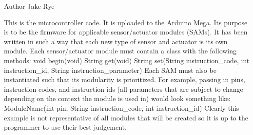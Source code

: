 \begin{DoxyAuthor}{Author}
Jake Rye
\end{DoxyAuthor}
This is the microcontroller code. It is uploaded to the Arduino Mega. It\textquotesingle{}s purpose is to be the firmware for applicable sensor/actuator modules (S\+A\+Ms). It has been written in such a way that each new type of sensor and actuator is its own module. Each sensor/actuator module must contain a class with the following methods\+: void begin(void) String get(void) String set(\+String instruction\+\_\+code, int instruction\+\_\+id, String instruction\+\_\+parameter) Each S\+A\+M must also be instantiated such that its modularity is prioritized. For example, passing in pins, instruction codes, and instruction ids (all parameters that are subject to change depending on the context the module is used in) would look something like\+: Module\+Name(int pin, String instruction\+\_\+code, int instruction\+\_\+id) Clearly this example is not representative of all modules that will be created so it is up to the programmer to use their best judgement. 